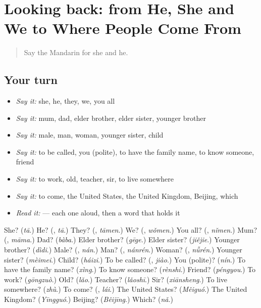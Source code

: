 \section[(dialogue)]{Looking back: from He, She and We to Where People Come From}

\label{lesson:ZH-R36-review-31-36}



\begin{quote}
Say the Mandarin for she and he.
\end{quote}

\subsection*{Your turn}
\begin{itemize}
\raggedright
  \item \emph{Say it:} she, he, they, we, you all
  \item \emph{Say it:} mum, dad, elder brother, elder sister, younger brother
  \item \emph{Say it:} male, man, woman, younger sister, child
  \item \emph{Say it:} to be called, you (polite), to have the family name, to know someone, friend
  \item \emph{Say it:} to work, old, teacher, sir, to live somewhere
  \item \emph{Say it:} to come, the United States, the United Kingdom, Beijing, which
  \item \emph{Read it:}       — each one aloud, then a word that holds it
\end{itemize}

\begin{tcolorbox}[breakable,colback=teal!4,colframe=teal!35!black,title={Before you move on}]
She? (\emph{tā}.) He? (\textbf{}, \emph{tā}.) They? (\textbf{}, \emph{tāmen}.) We? (\textbf{}, \emph{wǒmen}.) You all? (\textbf{}, \emph{nǐmen}.) Mum? (\textbf{}, \emph{māma}.) Dad? (\emph{bàba}.) Elder brother? (\emph{gēge}.) Elder sister? (\emph{jiějie}.) Younger brother? (\emph{dìdi}.) Male? (\textbf{}, \emph{nán}.) Man? (\textbf{}, \emph{nánrén}.) Woman? (\textbf{}, \emph{nǚrén}.) Younger sister? (\emph{mèimei}.) Child? (\emph{háizi}.) To be called? (\textbf{}, \emph{jiào}.) You (polite)? (\emph{nín}.) To have the family name? (\emph{xìng}.) To know someone? (\emph{rènshi}.) Friend? (\emph{péngyou}.) To work? (\emph{gōngzuò}.) Old? (\emph{lǎo}.) Teacher? (\emph{lǎoshī}.) Sir? (\emph{xiānsheng}.) To live somewhere? (\emph{zhù}.) To come? (\textbf{}, \emph{lái}.) The United States? (\emph{Měiguó}.) The United Kingdom? (\emph{Yīngguó}.) Beijing? (\emph{Běijīng}.) Which? (\emph{nǎ}.)
\end{tcolorbox}
